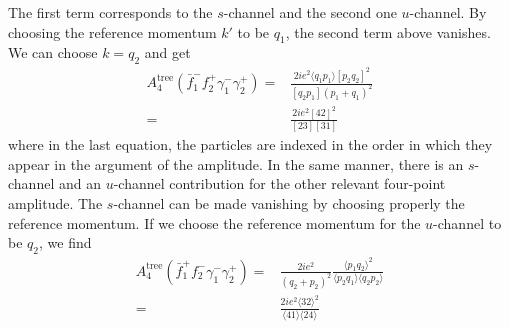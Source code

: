The first term corresponds to the $s$-channel and the second one $u$-channel.
By choosing the reference momentum $k'$ to be $q_1$, the second term above vanishes. 
We can choose $k = q_2$ and get 
\begin{equation*}
\begin{split}
A_{4}^{\mathrm{tree}}(\bar{f}_1^- f_2^+ \gamma_1^-\gamma_2^+) 
= &
\frac{2ie^2\langle q_1 p_1 \rangle[p_2 q_2]^2}{[q_2 p_1](p_1+q_1)^2}
\\ 
= &
\frac{2ie^2[42]^2}{[23][31]}
\end{split}
\end{equation*}
where in the last equation, the particles are indexed in the order in which they appear in the argument of the amplitude.
In the same manner, there is an $s$-channel and an $u$-channel contribution for the other relevant four-point amplitude. 
The $s$-channel can be made vanishing by choosing properly the reference momentum. 
If we choose the reference momentum for the $u$-channel to be $q_2$, we find 
\begin{equation*}
\begin{split}
A_4^{\mathrm{tree}}(\bar{f}_1^+ f_2^- \gamma_1^- \gamma_2^+) = & \frac{2ie^2}{(q_2+p_2)^2}\frac{\langle p_1q_2\rangle^2}{\langle p_2q_1\rangle\langle q_2p_2\rangle}
\\
= &
\frac{2ie^2\langle 32\rangle^2}{\langle 41 \rangle\langle 24\rangle}
\end{split}
\end{equation*}














